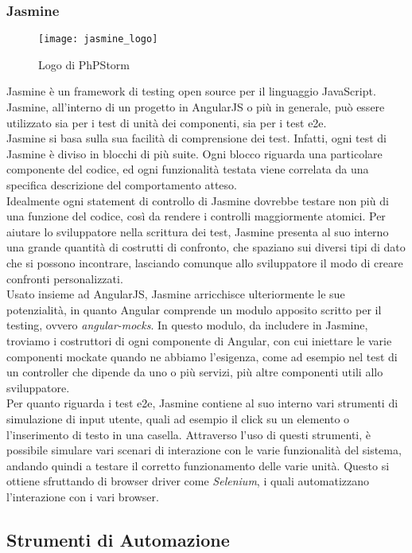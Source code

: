 \subsubsection{Jasmine}
\begin{figure}[htb] 
    \centering 
    \texttt{[image: jasmine\_logo]} 
    \caption{Logo di PhPStorm}
\end{figure}
Jasmine è un framework di testing open source per il linguaggio JavaScript. Jasmine, all’interno di un progetto in AngularJS o più in generale, può essere utilizzato sia per i test di unità dei componenti, sia per i test e2e.\\
Jasmine si basa sulla sua facilità di comprensione dei test. Infatti, ogni test di Jasmine è diviso in blocchi di più suite. Ogni blocco riguarda una particolare componente del codice, ed ogni funzionalità testata viene correlata da una specifica descrizione del comportamento atteso.\\
Idealmente ogni statement di controllo di Jasmine dovrebbe testare non più di una funzione del codice, così da rendere i controlli maggiormente atomici. Per aiutare lo sviluppatore nella scrittura dei test, Jasmine presenta al suo interno una grande quantità di costrutti di confronto, che spaziano sui diversi tipi di dato che si possono incontrare, lasciando comunque allo sviluppatore il modo di creare confronti personalizzati.\\
Usato insieme ad AngularJS, Jasmine arricchisce ulteriormente le sue potenzialità, in quanto Angular comprende un modulo apposito scritto per il testing, ovvero \emph{angular-mocks}. In questo modulo, da includere in Jasmine, troviamo i costruttori di ogni componente di Angular, con cui iniettare le varie componenti mockate quando ne abbiamo l’esigenza, come ad esempio nel test di un controller che dipende da uno o più servizi, più altre componenti utili allo sviluppatore.\\
Per quanto riguarda i test e2e, Jasmine contiene al suo interno vari strumenti di simulazione di input utente, quali ad esempio il click su un elemento o l’inserimento di testo in una casella. Attraverso l’uso di questi strumenti, è possibile simulare vari scenari di interazione con le varie funzionalità del sistema, andando quindi a testare il corretto funzionamento delle varie unità. 
Questo si ottiene sfruttando di browser driver come \emph{Selenium}, i quali automatizzano l’interazione con i vari browser.

\subsection{Strumenti di Automazione}
